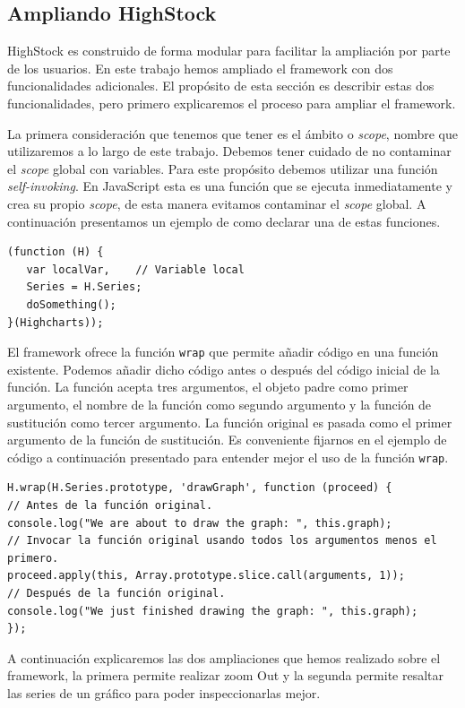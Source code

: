 	\subsection{Ampliando HighStock}
		HighStock es construido de forma modular para facilitar la ampliación por parte de los usuarios. En este trabajo hemos ampliado el
		framework con dos funcionalidades adicionales. El propósito de esta sección es describir estas dos funcionalidades, pero primero
		explicaremos el proceso para ampliar el framework.
		\par
		La primera consideración que tenemos que tener es el ámbito o \emph{scope}, nombre que utilizaremos a lo largo de este trabajo.
		Debemos tener cuidado de no contaminar el \emph{scope} global con variables. Para este propósito debemos utilizar una función
		\emph{self-invoking}. En JavaScript esta es una función que se ejecuta inmediatamente y crea su propio \emph{scope}, de esta manera
		evitamos contaminar el \emph{scope} global. A continuación presentamos un ejemplo de como declarar una de estas funciones.
		\begin{lstlisting}[style=myJs]
(function (H) {
   var localVar,	// Variable local
   Series = H.Series;
   doSomething();
}(Highcharts));
		\end{lstlisting}
		\par
		El framework ofrece la función \texttt{wrap} que permite añadir código en una función existente. Podemos añadir dicho código antes o
		después del código inicial de la función. La función acepta tres argumentos, el objeto padre como primer argumento, el nombre de la
		función como segundo argumento y la función de sustitución como tercer argumento. La función original es pasada como el primer
		argumento de la función de sustitución. Es conveniente fijarnos en el ejemplo de código a continuación presentado para entender mejor
		el uso de la función \texttt{wrap}.
		\begin{lstlisting}[style=myJs]
H.wrap(H.Series.prototype, 'drawGraph', function (proceed) {
// Antes de la función original.
console.log("We are about to draw the graph: ", this.graph);
// Invocar la función original usando todos los argumentos menos el primero.
proceed.apply(this, Array.prototype.slice.call(arguments, 1));
// Después de la función original.
console.log("We just finished drawing the graph: ", this.graph);
});
		\end{lstlisting}
		\par  
		A continuación explicaremos las dos ampliaciones que hemos realizado sobre el framework, la primera permite realizar zoom Out y la
		segunda permite resaltar las series de un gráfico para poder inspeccionarlas mejor.
